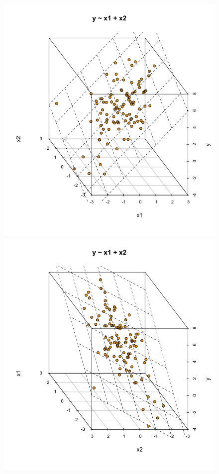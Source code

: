 \documentclass[
  a4paper,
]{scrbook}
\theoremstyle{definition}
\theoremstyle{definition}
\theoremstyle{definition}
\theoremstyle{remark}
\begin{document}
\begin{figure}
\begin{minipage}{0.33\linewidth}
\includegraphics{img/3d_scatter2.png}

\end{minipage}%
%
\begin{minipage}{0.33\linewidth}

\includegraphics{img/3d_scatter3.png}


\end{minipage}
\end{figure}
\end{document}
